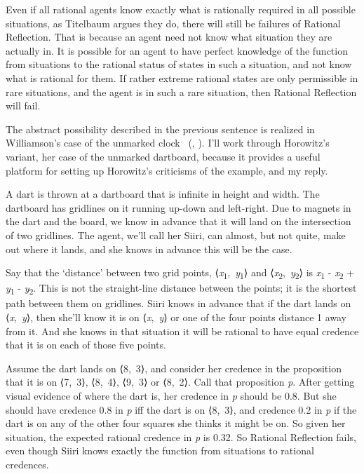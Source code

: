 \documentclass[
  10pt,
  letterpaper,
  twoside]{scrbook}
\begin{document}
Even if all rational agents know exactly what is rationally required in
all possible situations, as Titelbaum argues they do, there will still
be failures of Rational Reflection. That is because an agent need not
know what situation they are actually in. It is possible for an agent to
have perfect knowledge of the function from situations to the rational
status of states in such a situation, and not know what is rational for
them. If rather extreme rational states are only permissible in rare
situations, and the agent is in such a rare situation, then Rational
Reflection will fail.

The abstract possibility described in the previous sentence is realized
in Williamson's case of the unmarked clock
~(,
). I'll work through Horowitz's
variant, her case of the unmarked dartboard, because it provides a
useful platform for setting up Horowitz's criticisms of the example, and
my reply.

A dart is thrown at a dartboard that is infinite in height and width.
The dartboard has gridlines on it running up-down and left-right. Due to
magnets in the dart and the board, we know in advance that it will land
on the intersection of two gridlines. The agent, we'll call her {Siiri},
can almost, but not quite, make out where it lands, and she knows in
advance this will be the case.

Say that the `distance' between two grid points,
⟨\emph{x}\textsubscript{1},~\emph{y}\textsubscript{1}⟩ and
⟨\emph{x}\textsubscript{2},~\emph{y}\textsubscript{2}⟩ is
\textbar{}\emph{x}\textsubscript{1} -
\emph{x}\textsubscript{2}\textbar{} +
\textbar{}\emph{y}\textsubscript{1} - \emph{y}\textsubscript{2}\textbar.
This is not the straight-line distance between the points; it is the
shortest path between them on gridlines. {Siiri} knows in advance that
if the dart lands on ⟨\emph{x},~\emph{y}⟩, then she'll know it is on
⟨\emph{x},~\emph{y}⟩ or one of the four points distance 1 away from it.
And she knows in that situation it will be rational to have equal
credence that it is on each of those five points.

Assume the dart lands on ⟨8,~3⟩, and consider her credence in the
proposition that it is on ⟨7,~3⟩, ⟨8,~4⟩, ⟨9,~3⟩ or ⟨8,~2⟩. Call that
proposition \emph{p}. After getting visual evidence of where the dart
is, her credence in \emph{p} should be 0.8. But she should have credence
0.8 in \emph{p} iff the dart is on ⟨8,~3⟩, and credence 0.2 in \emph{p}
if the dart is on any of the other four squares she thinks it might be
on. So given her situation, the expected rational credence in \emph{p}
is 0.32. So Rational Reflection fails, even though {Siiri} knows exactly
the function from situations to rational credences.
\end{document}
